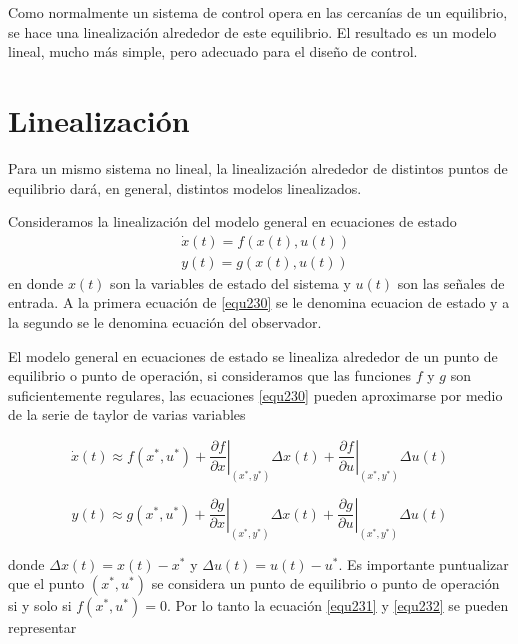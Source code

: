 \documentclass[12pt]{book}
\theoremstyle{definition}
\theoremstyle{remark}
\theoremstyle{plain}
\begin{document}
Como normalmente un sistema de control opera en las cercanías de un equilibrio, se hace una linealización alrededor de este equilibrio. El resultado es un modelo lineal, mucho más simple, pero adecuado para el diseño de control.

\section{Linealización}
Para un mismo sistema no lineal, la linealización alrededor de distintos puntos de equilibrio dará, en general, distintos modelos linealizados.

Consideramos la linealización del modelo general en ecuaciones de estado
\begin{equation}
\label{equ230}
\begin{aligned}
& \dot{x}(t) = f (x(t), u(t)) \\
& y(t) = g( x(t), u(t) )
\end{aligned}
\end{equation}
en donde $x(t)$ son la variables de estado del sistema y $u(t)$ son las señales de entrada. A la primera ecuación de \ref{equ230} se le denomina ecuacion de estado y a la segundo se le denomina ecuación del observador.

El modelo general en ecuaciones de estado se linealiza alrededor de un punto de equilibrio o punto de operación, si consideramos que las funciones $f$ y $g$ son suficientemente regulares, las ecuaciones \ref{equ230} pueden aproximarse por medio de la serie de taylor de varias variables

\begin{equation}
\label{equ231}
\dot{x}(t) \approx f(x^*,u^*)+ \left . \frac{\partial f}{\partial x}  \right | _ {(x^*, y^*)}\Delta x(t) + \left . \frac{\partial f}{\partial u}  \right |   _ {(x^*, y^*)} \Delta u(t)
\end{equation}

\begin{equation}
\label{equ232}
y(t) \approx g(x^*,u^*)+ \left . \frac{\partial g}{\partial x}  \right | _ {(x^*, y^*)}\Delta x(t) + \left . \frac{\partial g}{\partial u}  \right |   _ {(x^*, y^*)} \Delta u(t)
\end{equation}

donde  $\Delta x(t) = x(t)- x^*$ y $\Delta u (t) = u(t) - u^*$. Es importante puntualizar que el punto $(x^*, u^*)$ se considera un punto de equilibrio o punto de operación si y solo si $f(x^*, u^*) =0$. Por lo tanto la ecuación \ref{equ231} y \ref{equ232} se pueden representar
\end{document}
